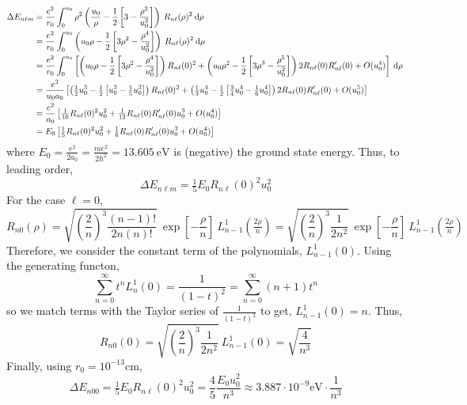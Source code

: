 \documentclass[12pt]{extarticle}
\begin{document}
\begin{align*}
\Delta E_{n \ell m} & = \frac{e^2}{r_0} \int_{0}^{u_0} \rho^2  \left( \frac{u_0}{\rho} - \frac{1}{2} \left[3 - \frac{\rho^2}{u_0^2} \right] \right) \: R_{n \ell}(\rho)^2  \: \mathrm{d}\rho \: \\
& = \frac{e^2}{r_0} \int_{0}^{u_0} \left( u_0 \rho - \frac{1}{2} \left[3 \rho^2 - \frac{\rho^4}{u_0^2} \right] \right) \: R_{n \ell}(\rho)^2  \: \mathrm{d}\rho \: \\
& = \frac{e^2}{r_0} \int_{0}^{u_0} \left[ \left( u_0 \rho - \frac{1}{2} \left[3 \rho^2 - \frac{\rho^4}{u_0^2} \right] \right) R_{n \ell}(0)^2 + \left( u_0 \rho^2 - \frac{1}{2} \left[3 \rho^3 - \frac{\rho^5}{u_0^2} \right] \right)  2 R_{n \ell}(0) R_{n \ell}'(0) + O(u_0^4) \right] \: \mathrm{d}\rho \: \\
& = \frac{e^2}{u_0 a_0} \left[ \left( \tfrac{1}{2} u_0^3 - \tfrac{1}{2} \left[ u_0^3 - \tfrac{1}{5} u_0^3 \right] \right) R_{n \ell}(0)^2 + \left( \tfrac{1}{3} u_0^4 - \tfrac{1}{2} \left[\tfrac{3}{4} u_0^4 - \tfrac{1}{6} u_0^4 \right] \right)  2 R_{n \ell}(0) R_{n \ell}'(0) + O(u_0^5) \right]  \\
& = \frac{e^2}{a_0} \left[ \tfrac{1}{10} R_{n \ell}(0)^2 u_0^2 + \tfrac{1}{12} R_{n \ell}(0) R_{n \ell}'(0) u_0^3 + O(u_0^4) \right]  \\
& = E_0 \left[ \tfrac{1}{5} R_{n \ell}(0)^2 u_0^2 + \tfrac{1}{6} R_{n \ell}(0) R_{n \ell}'(0) u_0^3 + O(u_0^4) \right] 
\end{align*}
where $E_0 = \frac{e^2}{2 a_0} = \frac{m e^2}{2 \hbar^2} = 13.605 \: \mathrm{eV}$ is (negative) the ground state energy. 
Thus, to leading order,
\[ \Delta E_{n \ell m} = \tfrac{1}{5} E_0  R_{n \ell}(0)^2 u_0^2 \]
For the case $\ell = 0$,
\[ R_{n0}(\rho) = \sqrt{\left(\frac{2}{n}\right)^3 \frac{(n - 1)!}{2n (n)!}}\: \exp{\left[-\frac{\rho}{n}\right]} \: L^{1}_{n - 1}\left(\tfrac{2 \rho}{n} \right) = \sqrt{\left(\frac{2}{n}\right)^3 \frac{1}{2 n^2}} \: \exp{\left[-\frac{\rho}{n}\right]} \: L^{1}_{n - 1}\left(\tfrac{2 \rho}{n} \right) \]
Therefore, we consider the constant term of the polynomials, $L^{1}_{n - 1}\left( 0 \right)$. Using the generating functon,
\[ \sum_{n = 0}^{\infty} t^n L^{1}_n(0) = \frac{1}{(1 - t)^2} = \sum_{n = 0}^\infty (n + 1) t^n \]
so we match terms with the Taylor series of $\frac{1}{(1 - t)^2}$ to get, $L^1_{n - 1}(0) = n$. Thus,
\[ R_{n0}(0) = \sqrt{\left(\frac{2}{n}\right)^3 \frac{1}{2 n^2}} \: L^{1}_{n - 1}\left( 0 \right) = \sqrt{\frac{4}{n^3}} \]
Finally, using $r_0 = 10^{-13} \mathrm{cm}$, 
\[ \Delta E_{n 00} = \tfrac{1}{5} E_0  R_{n \ell}(0)^2 u_0^2 = \frac{4}{5} \frac{E_0 u_0^2}{n^3} \approx 3.887 \cdot 10^{-9} \mathrm{eV} \cdot \frac{1}{n^3} \]
\end{document}
